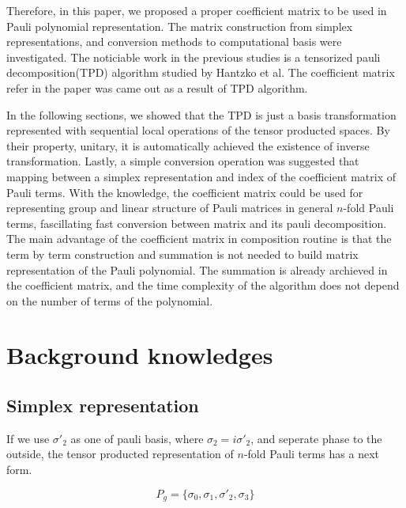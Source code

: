 \documentclass[twocolumn]{article}
\begin{document}
Therefore, in this paper, we proposed a proper coefficient matrix 
to be used in Pauli polynomial representation.
The matrix construction from simplex representations, 
and conversion methods to computational basis were investigated. 
The noticiable work in the previous studies is a tensorized pauli decomposition(TPD) algorithm studied by Hantzko et al\cite{hantzko_tensorized_2023}.
The coefficient matrix refer in the paper was came out as a result of TPD algorithm.

In the following sections, we showed that the TPD is just a basis transformation 
represented with sequential local operations of the tensor producted spaces. 
By their property, unitary, it is automatically achieved the existence of inverse transformation.
Lastly, a simple conversion operation was suggested that mapping between a simplex representation and index of the coefficient matrix
of Pauli terms.
With the knowledge, the coefficient matrix could be used for representing group and linear structure 
of Pauli matrices in general $n$-fold Pauli terms, fascillating fast conversion between matrix and its pauli decomposition.
The main advantage of the coefficient matrix in composition routine is that the term by term construction and summation is not 
needed to build matrix representation of the Pauli polynomial. The summation is already archieved in the coefficient matrix, 
and the time complexity of the algorithm does not depend on the number of terms of the polynomial. 


\section{Background knowledges}


\subsection{Simplex representation}

If we use $\sigma'_2$ as one of pauli basis, where $\sigma_2 = i \sigma'_2$,
and seperate phase to the outside,
the tensor producted representation of $n$-fold Pauli terms has a next form.

\begin{equation}
    P_{g} = \{\sigma_0 , \sigma_1, \sigma'_2, \sigma_3\}
\end{equation}
\end{document}

